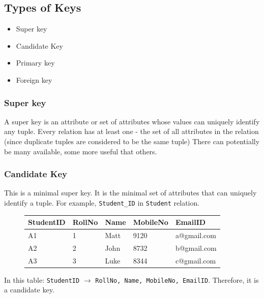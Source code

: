 \documentclass{report}
\begin{document}
    \subsection*{Types of Keys}
    \begin{itemize}
        
\item Super key
\item Candidate Key
\item Primary key
\item Foreign key
    \end{itemize}
    \subsubsection*{Super key}
    A super key is an attribute or set of attributes whose values can uniquely identify any tuple. 
    \bigbreak \noindent
    Every relation has at least one - the set of all attributes in the relation (since duplicate tuples are considered to be the same tuple)
    \bigbreak \noindent
    There can potentially be many available, some more useful that others.
    \subsubsection*{Candidate Key}
    This is a minimal super key. It is the minimal set of attributes that can uniquely identify a tuple. For example, \texttt{Student\_ID} in \texttt{Student} relation.
        \begin{figure}[H]
        \centering
        \begin{tabular}{l l l l l}
            \hline
        StudentID& RollNo& Name & MobileNo & EmailID \\
        \hline
        A1&1&Matt&9120&a@gmail.com \\
        A2&2&John&8732&b@gmail.com \\
        A3&3&Luke&8344&c@gmail.com \\
        \hline
        \end{tabular}
        \end{figure}
\noindent In this table:
\texttt{StudentID} $\rightarrow$ \texttt{RollNo, Name, MobileNo, EmailID}. Therefore, it is a candidate key.
\end{document}
